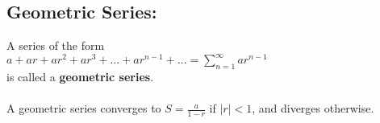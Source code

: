 
\vspace*{.1in}

\subsection*{Geometric Series:}
A series of the form\\
\( a+ ar+ ar^2+ ar^3+ \ldots+ ar^{n-1}+\ldots = \sum_{n=1}^\infty a r^{n-1}\)\\
is called a \textbf{geometric series}. \\~\\
A geometric series converges to \(S=\frac{a}{1-r}\) if \(|r|<1\), and diverges otherwise.




%
%
%
%
%



